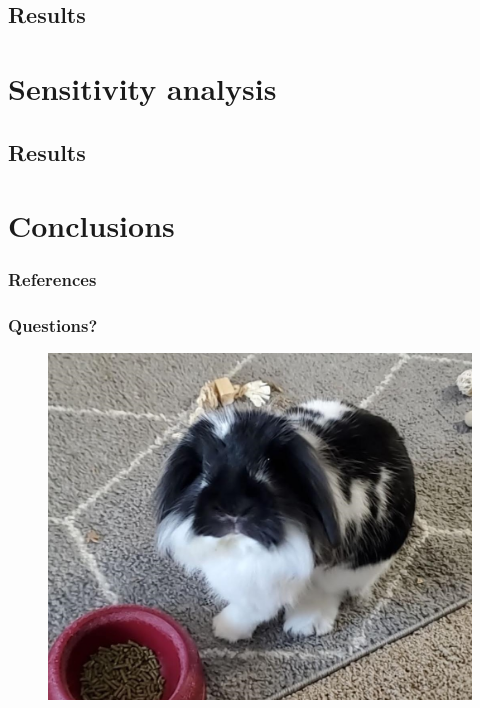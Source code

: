 \documentclass[9pt,xcolor={table}]{beamer}
\begin{document}
\subsection{Results}

\section{Sensitivity analysis}

\subsection{Results}

\section{Conclusions}




\begin{frame}[allowframebreaks]
    \frametitle{References}
    
    {\footnotesize  }
  
\end{frame}

\begin{frame}
  \frametitle{Questions?}
    \begin{figure}
      \centering
      \includegraphics[scale=0.3]{littleR.jpg}
    \end{figure}
\end{frame}


\end{document}
